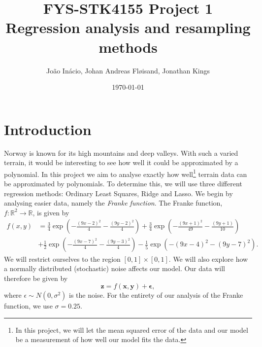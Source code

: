 \documentclass[10pt, a4paper]{article}
\title{{\Large \textbf{FYS-STK4155} Project 1} \\ 
            Regression analysis and resampling methods}
\author{João Inácio, Johan Andreas Fløisand, Jonathan Kings}
\date{\today}
\begin{document}
\maketitle

\section*{Introduction}

    Norway is known for its high mountains and deep valleys. With such a varied terrain, it would be interesting to see how well it could be approximated by a polynomial. In this project we aim to analyse exactly how well\footnote{In this project, we will let the mean squared error of the data and our model be a measurement of how well our model fits the data.} terrain data can be approximated by polynomials. To determine this, we will use three different regression methods: Ordinary Least Squares, Ridge and Lasso. We begin by analysing easier data, namely the \textit{Franke function}. The Franke function, $f:\mathbb{R}^2\to\mathbb{R}$, is given by
    \begin{align*}
    f(x,y) &= \frac{3}{4}\exp{\left(-\frac{(9x-2)^2}{4} - \frac{(9y-2)^2}{4}\right)}+\frac{3}{4}\exp{\left(-\frac{(9x+1)^2}{49}- \frac{(9y+1)}{10}\right)} \\
    &+\frac{1}{2}\exp{\left(-\frac{(9x-7)^2}{4} - \frac{(9y-3)^2}{4}\right)} -\frac{1}{5}\exp{\left(-(9x-4)^2 - (9y-7)^2\right) }.
    \end{align*}
    We will restrict ourselves to the region $[0,1]\times[0,1]$. We will also explore how a normally distributed (stochastic) noise affects our model. Our data will therefore be given by
    \begin{equation} \label{eq:data_model}
        \bm{z} = f(\bm{x},\bm{y}) + \bm{\epsilon},
    \end{equation}
    where \(\epsilon \sim N(0,\sigma^2)\) is the noise. For the entirety of our analysis of the Franke function, we use \(\sigma=0.25\).
    
\end{document}
